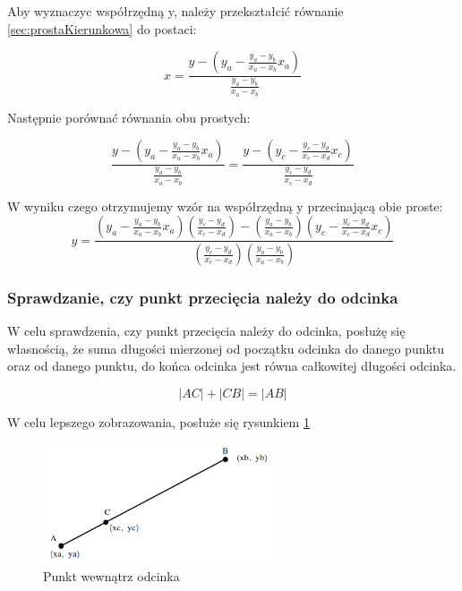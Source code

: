 Aby wyznaczyc współrzędną y, należy przekształcić równanie \ref{sec:prostaKierunkowa} do postaci:

\begin{equation} \label{sec:prostaKierunkowaX}
x=\frac{y - (y_a - \frac{y_a - y_b}{x_a - x_b}x_a)}{\frac{y_a - y_b}{x_a - x_b}}
\end{equation}

Następnie porównać równania obu prostych:

\begin{equation} \label{sec:prostaKierunkowaX}
\frac{y - (y_a - \frac{y_a - y_b}{x_a - x_b}x_a)}{\frac{y_a - y_b}{x_a - x_b}}=\frac{y - (y_c - \frac{y_c - y_d}{x_c - x_d}x_c)}{\frac{y_c - y_d}{x_c - x_d}}
\end{equation}

W wyniku czego otrzymujemy wzór na współrzędną y przecinającą obie proste:
\begin{equation} \label{sec:prostaKierunkowaX}
y = \frac{(y_a - \frac{y_a - y_b}{x_a - x_b}x_a)(\frac{y_c - y_d}{x_c - x_d}) - (\frac{y_a - y_b}{x_a - x_b})(y_c - \frac{y_c - y_d}{x_c - x_d}x_c)}
{(\frac{y_c - y_d}{x_c - x_d})(\frac{y_a - y_b}{x_a - x_b})}
\end{equation}

\subsubsection{Sprawdzanie, czy punkt przecięcia należy do odcinka}

W celu sprawdzenia, czy punkt przecięcia należy do odcinka, posłużę się własnością, że suma długości mierzonej od początku odcinka do danego punktu oraz od danego punktu, do końca odcinka jest równa całkowitej długości odcinka. 

\begin{equation} \label{eq:pointInSegment}
|AC| + |CB| = |AB|
\end{equation}

W celu lepszego zobrazowania, posłuże się rysunkiem \ref{sec:pointSegment}

\newpage
\begin{figure}[h]
\label{sec:pointSegment}
\caption{Punkt wewnątrz odcinka}
\centering
\includegraphics[width=0.6\textwidth]{pointInSegment}
\end{figure}

